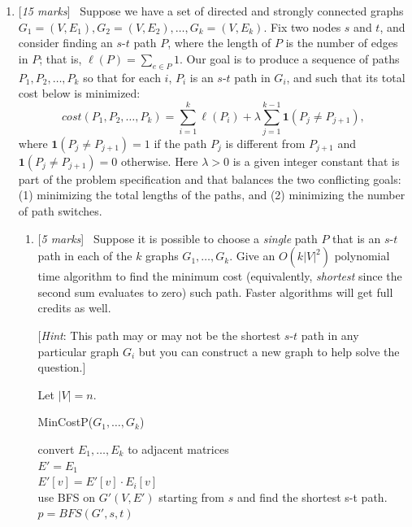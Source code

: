\documentclass[11pt]{article}
\newcommand{\Q}[1]{\medskip\item {[{\em #1 marks\/}]}\ }
\begin{document}
\begin{enumerate}
\newpage
\Q{15}
Suppose we have a set of directed and strongly connected graphs $G_1=(V, E_1),G_2= (V, E_2), \ldots, G_k=(V, E_k)$. Fix two nodes $s$ and $t$, and consider finding an $s$-$t$ path $P$, where the length of $P$ is the number of edges in $P$; that is, $\ell(P) = \sum_{e\in P} 1$. Our goal is to produce a sequence of paths $P_1, P_2, \ldots, P_k$ so that for each $i$, $P_i$ is an $s$-$t$ path in $G_i$, and such that its total cost below is minimized:
$$
cost(P_1, P_2, \ldots, P_k) = \sum_{i=1}^k \ell(P_i) + \lambda \sum_{j=1}^{k-1} \mathbf{1}(P_j\ne P_{j+1}),
$$
where $\mathbf{1}(P_j\ne P_{j+1}) = 1$ if the path $P_j$ is different from $P_{j+1}$ and $\mathbf{1}(P_j\ne P_{j+1}) = 0$ otherwise. Here $\lambda > 0$ is a given integer constant that is part of the problem specification and that balances the two conflicting goals: (1) minimizing the total lengths of the paths, and (2) minimizing the number of path switches.

\begin{enumerate}
	\Q{5} Suppose it is possible to choose a \emph{single} path $P$ that is an $s$-$t$ path in each of the $k$ graphs $G_1, \ldots, G_k$. Give an $O(k|V|^2)$ polynomial time algorithm to find the minimum cost (equivalently, \emph{shortest} since the second sum evaluates to zero) such path. Faster algorithms will get full credits as well.
	
	[\emph{Hint}: This path may or may not be the shortest $s$-$t$ path in any particular graph $G_i$ but you can construct a new graph to help solve the question.]
    
    Let $|V| = n$.
\begin{algorithm}[h]
    \caption{MinCostP($G_1, \dots, G_k$)}
    convert $E_1, \dots, E_k$ to adjacent matrices\\
    $E' = E_1$\\
     {
         {
            $E'[v] = E'[v] \cdot E_i[v]$\\
        }
    }
    use BFS on $G'(V, E')$ starting from $s$ and find the shortest s-t path.\\
    $p = BFS(G', s, t)$\\
     {
        \Return{$(\emptyset, \infty)$}
    }
\end{algorithm}
    

\end{enumerate}
\end{enumerate}
\end{document}
